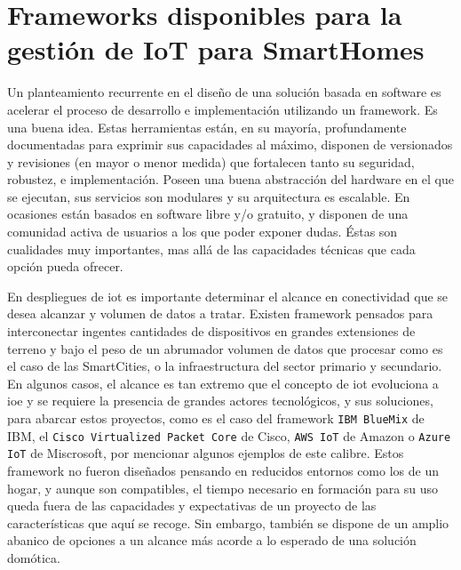 \section{Frameworks disponibles para la gestión de IoT para SmartHomes}
\label{ch:Capitulo2.2}

Un planteamiento recurrente en el diseño de una solución basada en software es acelerar el proceso de desarrollo e implementación utilizando un \gls{framework}. Es una buena idea. Estas herramientas están, en su mayoría, profundamente documentadas para exprimir sus capacidades al máximo, disponen de versionados y revisiones (en mayor o menor medida) que fortalecen tanto su seguridad, robustez, e implementación. Poseen una buena abstracción del hardware en el que se ejecutan, sus servicios son modulares y su arquitectura es escalable. En ocasiones están basados en software libre y/o gratuito, y disponen de una comunidad activa de usuarios a los que poder exponer dudas. Éstas son cualidades muy importantes, mas allá de las capacidades técnicas que cada opción pueda ofrecer.

\vspace{1cm}

En despliegues de \gls{iot} es importante determinar el alcance en conectividad que se desea alcanzar y volumen de datos a tratar. Existen \gls{framework} pensados para interconectar ingentes cantidades de dispositivos en grandes extensiones de terreno y bajo el peso de un abrumador volumen de datos que procesar como es el caso de las SmartCities, o la infraestructura del sector primario y secundario. En algunos casos, el alcance es tan extremo que el concepto de \gls{iot} evoluciona a \gls{ioe} y se requiere la presencia de grandes actores tecnológicos, y sus soluciones, para abarcar estos proyectos, como es el caso del framework \verb|IBM BlueMix| de IBM, el \verb|Cisco Virtualized Packet Core| de Cisco, \verb|AWS IoT| de Amazon o \verb|Azure IoT| de Miscrosoft, por mencionar algunos ejemplos de este calibre. Estos \gls{framework} no fueron diseñados pensando en reducidos entornos como los de un hogar, y aunque son compatibles, el tiempo necesario en formación para su uso queda fuera de las capacidades y expectativas de un proyecto de las características que aquí se recoge. Sin embargo, también se dispone de un amplio abanico de opciones a un alcance más acorde a lo esperado de una solución domótica.

\vspace{1cm}

